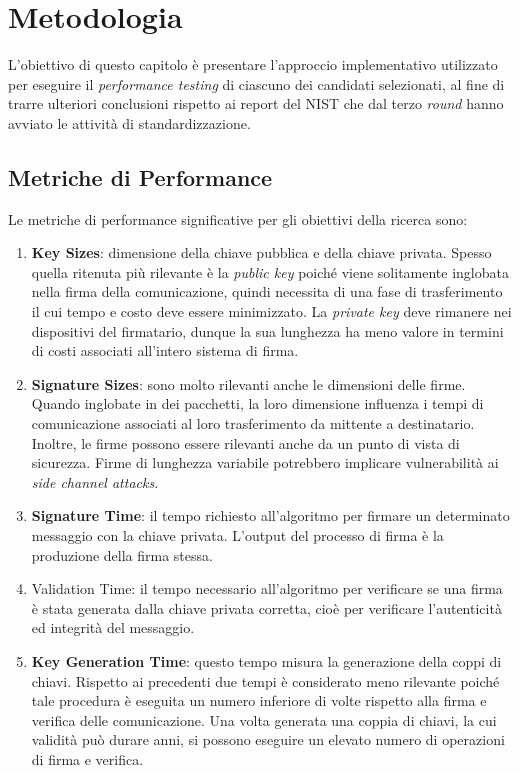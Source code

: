 \chapter{Metodologia}

L'obiettivo di questo capitolo è presentare l'approccio implementativo utilizzato per eseguire il \textit{performance testing} di ciascuno dei candidati selezionati, al fine di trarre ulteriori conclusioni rispetto ai report del NIST che dal terzo \textit{round} hanno avviato le attività di standardizzazione.



\section{Metriche di Performance}

Le metriche di performance significative per gli obiettivi della ricerca sono:
\begin{enumerate}
    \item \textbf{Key Sizes}: dimensione della chiave pubblica e della chiave privata. Spesso quella ritenuta più rilevante è la \textit{public key} poiché viene solitamente inglobata nella firma della comunicazione, quindi necessita di una fase di trasferimento il cui tempo e costo deve essere minimizzato. La \textit{private key} deve rimanere nei dispositivi del firmatario, dunque la sua lunghezza ha meno valore in termini di costi associati all'intero sistema di firma.
    \item \textbf{Signature Sizes}: sono molto rilevanti anche le dimensioni delle firme. Quando inglobate in dei pacchetti, la loro dimensione influenza i tempi di comunicazione associati al loro trasferimento da mittente a destinatario. Inoltre, le firme possono essere rilevanti anche da un punto di vista di sicurezza. Firme di lunghezza variabile potrebbero implicare vulnerabilità ai \textit{side channel attacks}.
    \item \textbf{Signature Time}: il tempo richiesto all'algoritmo per firmare un determinato messaggio con la chiave privata. L'output del processo di firma è la produzione della firma stessa.
    \item Validation Time: il tempo necessario all'algoritmo per verificare se una firma è stata generata dalla chiave privata corretta, cioè per verificare l'autenticità ed integrità del messaggio.
    \item \textbf{Key Generation Time}: questo tempo misura la generazione della coppi di chiavi. Rispetto ai precedenti due tempi è considerato meno rilevante poiché tale procedura è eseguita un numero inferiore di volte rispetto alla firma e verifica delle comunicazione. Una volta generata una coppia di chiavi, la cui validità può durare anni, si possono eseguire un elevato numero di operazioni di firma e verifica.
\end{enumerate}

